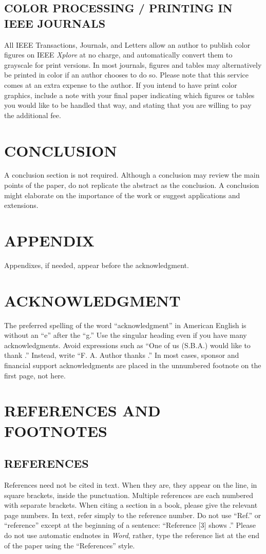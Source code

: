 \documentclass{IEEEoj}
\begin{document}
\subsection{COLOR PROCESSING / PRINTING IN IEEE JOURNALS}
All IEEE Transactions, Journals, and Letters allow an author to publish 
color figures on IEEE \textit{Xplore}{\textregistered} at no charge, and automatically 
convert them to grayscale for print versions. In most journals, figures and 
tables may alternatively be printed in color if an author chooses to do so. 
Please note that this service comes at an extra expense to the author. If 
you intend to have print color graphics, include a note with your final 
paper indicating which figures or tables you would like to be handled that 
way, and stating that you are willing to pay the additional fee.

\section{CONCLUSION}
A conclusion section is not required. Although a conclusion may review the 
main points of the paper, do not replicate the abstract as the conclusion. A 
conclusion might elaborate on the importance of the work or suggest 
applications and extensions.

\section*{APPENDIX}
Appendixes, if needed, appear before the acknowledgment.

\section*{ACKNOWLEDGMENT}
The preferred spelling of the word ``acknowledgment'' in American English is 
without an ``e'' after the ``g.'' Use the singular heading even if you have 
many acknowledgments. Avoid expressions such as ``One of us (S.B.A.) would 
like to thank \textellipsis .'' Instead, write ``F. A. Author thanks \textellipsis .'' In most 
cases, sponsor and financial support acknowledgments are placed in the 
unnumbered footnote on the first page, not here.

\section*{REFERENCES AND FOOTNOTES}
\subsection{REFERENCES}
References need not be cited in text. When they are, they appear on the 
line, in square brackets, inside the punctuation. Multiple references are 
each numbered with separate brackets. When citing a section in a book, 
please give the relevant page numbers. In text, refer simply to the 
reference number. Do not use ``Ref.'' or ``reference'' except at the 
beginning of a sentence: ``Reference [3] shows \textellipsis .'' Please do not use 
automatic endnotes in \textit{Word}, rather, type the reference list at the end of the 
paper using the ``References'' style.
\end{document}
